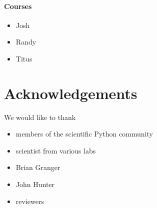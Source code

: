 \documentclass[ChapterTOCs,krantz2]{krantz} %
\begin{document}
\paragraph{ {\bf Courses}}

\begin{itemize}

\item Josh

\item Randy

\item Titus

\end{itemize}


\section*{Acknowledgements}
We would like to thank
\begin{itemize}
\item members of the scientific Python community
\item scientist from various labs
\item Brian Granger
\item John Hunter
\item reviewers
\end{itemize}



\end{document}
